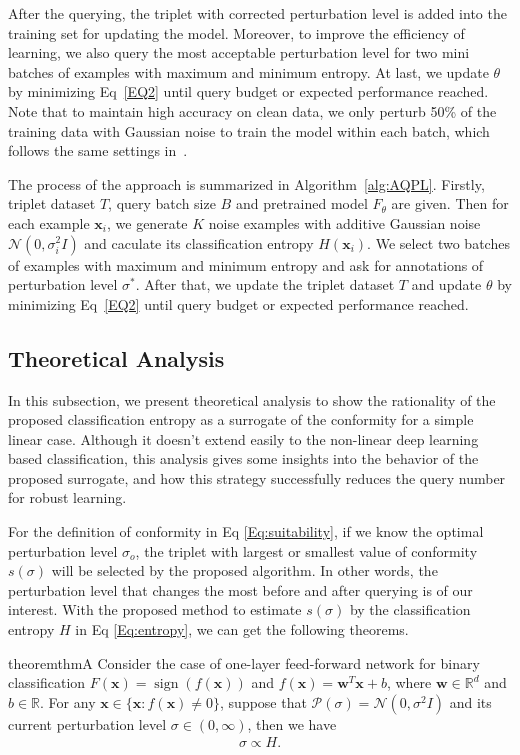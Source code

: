 \documentclass[letterpaper]{article} %
\begin{document}
After the querying, the triplet with corrected perturbation level is added into the training set for updating the model.
Moreover, to improve the efficiency of learning, we also query the most acceptable perturbation level for two mini batches of examples with maximum and minimum entropy.
At last, we update $\theta$ by minimizing Eq~\ref{EQ2} until query budget or expected performance reached.
Note that to maintain high accuracy on clean data, we only perturb 50\% of the training data with Gaussian noise to train the model within each batch, which follows the same settings in~\cite{rusak2020increasing}.

The process of the approach is summarized in Algorithm~\ref{alg:AQPL}. Firstly, triplet dataset $T$, query batch size $B$ and pretrained model $F_\theta$ are given. Then for each example $\mathbf{x}_i$, we generate $K$ noise examples with additive Gaussian noise $\mathcal{N}(0,\sigma_i^2 I)$ and caculate its classification entropy $H(\mathbf{x}_i)$.
We select two batches of examples with maximum and minimum entropy and ask for annotations of perturbation level $\sigma^*$. After that, we update the triplet dataset $T$ and update $\theta$ by minimizing Eq~\ref{EQ2} until query budget or expected performance reached.

\subsection{Theoretical Analysis}

In this subsection, we present theoretical analysis to show the rationality of the proposed classification entropy as a surrogate of the conformity for a simple linear case. Although it doesn't extend easily to the non-linear deep learning based classification, this analysis gives some insights into the behavior of the proposed surrogate, and how this strategy successfully reduces the query number for robust learning.

For the definition of conformity in Eq \ref{Eq:suitability}, if we know the optimal perturbation level $\sigma_o$, the triplet with largest or smallest value of conformity $s(\sigma)$  will be selected by the proposed algorithm. In other words, the perturbation level that changes the most before and after querying is of our interest. With the proposed method to estimate $s(\sigma)$ by the classification entropy $H$ in Eq \ref{Eq:entropy}, we can get the following theorems.

\begin{restatable}[]{theorem}{thmA}
	\label{theorem:thmA}
	Consider the case of one-layer feed-forward network for binary classification $F(\mathbf{x}) = \operatorname{sign}(f(\mathbf{x}))$ and $f(\mathbf{x}) = \mathbf{w}^T \mathbf{x} + b$, where $\mathbf{w} \in \mathbb{R}^d$ and $b \in \mathbb{R}$.
	For any $\mathbf{x} \in \{\mathbf{x}: f(\mathbf{x}) \neq 0\}$, suppose that $\mathcal{P}(\sigma) = \mathcal{N}(0, \sigma^{2} I)$ and its current perturbation level $\sigma \in (0, \infty)$, then we have
	\begin{align}
	\sigma \propto H.
	\end{align}
\end{restatable}
\end{document}
